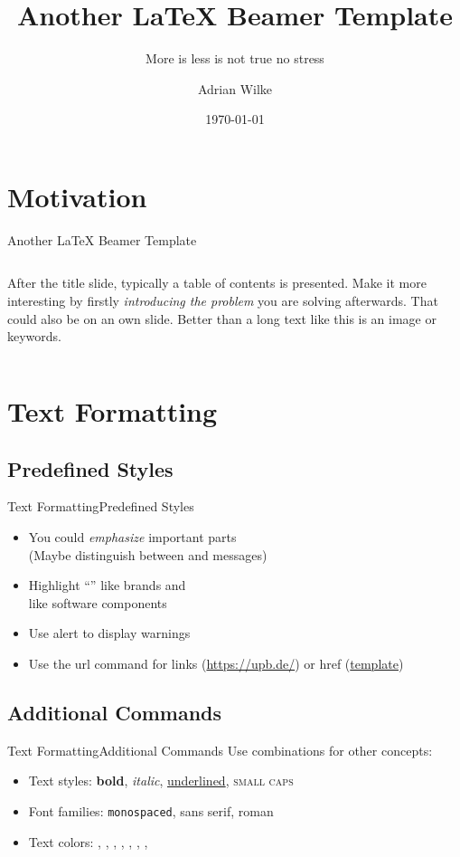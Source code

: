 \documentclass{beamer}
\author[A.~Wilke]{Adrian Wilke}
\institute[dice]{DICE Group\\Paderborn University}
\title[Another LaTeX Beamer Template]{Another LaTeX Beamer Template}
\subtitle{More is less is not true no stress}
\date{\today}
\begin{document}
{ 
	\frame{\titlepage}
}\addtocounter{framenumber}{-1}

\section{Motivation}

\begin{frame}{Another LaTeX Beamer Template}
	\begin{columns}[T]
		After the title slide, typically a table of contents is presented. Make it more interesting by firstly \emph{introducing the problem} you are solving afterwards. That could also be on an own slide. Better than a long text like this is an image or keywords.
		\vspace*{.2cm}
		\hypersetup{linkcolor=urls}
		\tableofcontents
	\end{columns}
\end{frame}

\section{Text Formatting}
\subsection{Predefined Styles}
\begin{frame}{Text Formatting}{Predefined Styles}
	\begin{itemize}
		\item You could \emph{emphasize} important parts \\(Maybe distinguish between  and  messages)
		\item Highlight ``'' like brands and\\  like software components
		\item Use alert to display \alert{warnings}
		\item Use the url command for links (\url{https://upb.de/}) or href (\href{https://github.com/adibaba/templates}{template})
	\end{itemize}
\end{frame}

\subsection{Additional Commands}
\begin{frame}{Text Formatting}{Additional Commands}
	Use combinations for other concepts:
	\begin{itemize}
		\item Text styles: \textbf{bold}, \textit{italic}, \underline{underlined}, \textsc{small caps}
		\item Font families: \texttt{monospaced}, \textsf{sans serif}, \textrm{roman}
		\item Text colors: , , , , , , , 
	\end{itemize}
\end{frame}
\end{document}
